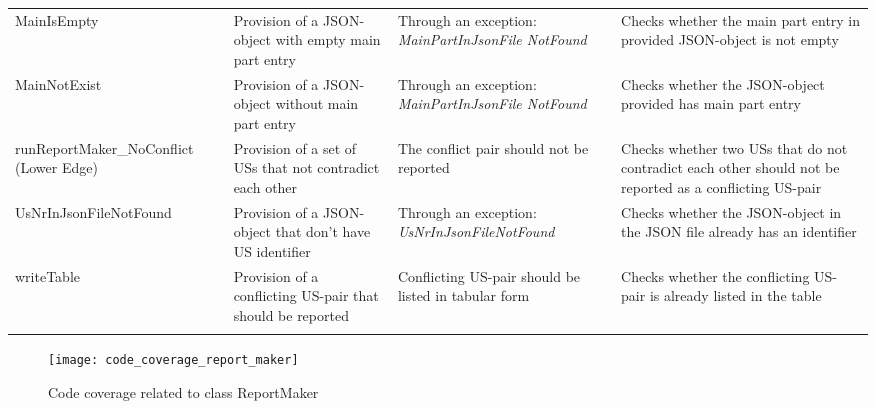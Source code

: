 \begin{tabularx}{\textwidth}{X  X  X  X}
	MainIsEmpty&Provision of a JSON-object with empty main part entry&Through an exception: \textit{MainPartInJsonFile NotFound}&Checks whether the main part entry in provided JSON-object is not empty\\
	
	MainNotExist&Provision of a JSON-object without main part entry&Through an exception: \textit{MainPartInJsonFile NotFound }&Checks whether the JSON-object provided has main part entry\\
	
	runReportMaker\_NoConflict \newline (Lower Edge)&Provision of a set of USs that not contradict each other&The conflict pair should not be reported&Checks whether two USs that do not contradict each other should not be reported as a conflicting US-pair\\
	
	UsNrInJsonFileNotFound&Provision of a JSON-object that don't have US identifier&Through an exception: \textit{UsNrInJsonFileNotFound}&Checks whether the JSON-object in the JSON file already has an identifier\\
	
	writeTable&Provision of a conflicting US-pair that should be reported&Conflicting US-pair should be listed in tabular form&Checks whether the conflicting US-pair is already listed in the table\\
	\hline
	\caption{Test cases for ReportMaker  class}\label{tb:test_cases_report_maker}
\end{tabularx}

\endgroup
\thispagestyle{empty}

\begin{figure}[h]
	\centering
	\texttt{[image: code\_coverage\_report\_maker]}
	\caption{Code coverage related to class ReportMaker}\label{fig:code_coverage_report_maker}
\end{figure}


